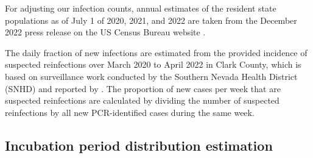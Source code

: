 \documentclass{article}
\begin{document}
For adjusting our infection counts, annual estimates of the resident state
populations as of July 1 of 2020, 2021, and 2022 are taken from the December
2022 press release on the US Census Bureau website \citep{uscensus2022annual}.

The daily fraction of new infections are estimated from the provided incidence
of suspected reinfections over March 2020 to April 2022 in Clark County, which
is based on surveillance work conducted by the Southern Nevada Health District
(SNHD) and reported by \citet{ruff2022rapid}. The proportion of new cases per
week that are suspected reinfections are calculated by dividing the number of
suspected reinfections by all new PCR-identified cases during the same week. 

\subsection{Incubation period distribution estimation} 
\end{document}
